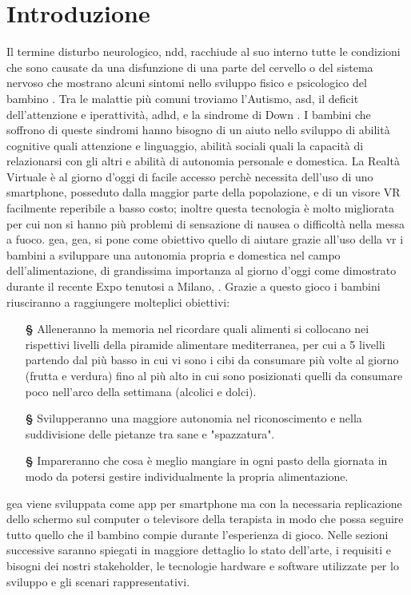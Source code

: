 \section{Introduzione} \label{sec:intro}
Il termine disturbo neurologico, \acs{ndd}, racchiude al suo interno tutte le condizioni che sono causate da una disfunzione di una parte del cervello o del sistema nervoso che mostrano alcuni sintomi nello sviluppo fisico e psicologico del bambino \cite{rif1}. Tra le malattie più comuni troviamo l'Autismo, \acs{asd}, il deficit dell'attenzione e iperattività, \acs{adhd}, e la sindrome di Down \cite{rif2}. I bambini che soffrono di queste sindromi hanno bisogno di un aiuto nello sviluppo di abilità cognitive quali attenzione e linguaggio, abilità sociali quali la capacità di relazionarsi con gli altri e abilità di autonomia personale e domestica. La Realtà Virtuale è al giorno d'oggi di facile accesso perchè necessita dell'uso di uno smartphone, posseduto dalla maggior parte della popolazione, e di un visore VR facilmente reperibile a basso costo; inoltre questa tecnologia è molto migliorata  per cui non si hanno più problemi di sensazione di nausea o difficoltà nella messa a fuoco. \acs{gea}, \acl{gea}, si pone come obiettivo quello di aiutare grazie all'uso della \acs{vr} i bambini a sviluppare una autonomia propria e domestica nel campo dell'alimentazione, di grandissima importanza al giorno d'oggi come dimostrato durante il recente Expo tenutosi a Milano, \cite{rif16}. Grazie a questo gioco i bambini riusciranno a raggiungere molteplici obiettivi:
\begin{itemize}
\item[\textbf{§}] Alleneranno la memoria nel ricordare quali alimenti si collocano nei rispettivi livelli della piramide alimentare mediterranea, per cui a 5 livelli partendo dal più basso in cui vi sono i cibi da consumare più volte al giorno (frutta e verdura) fino al più alto in cui sono posizionati quelli da consumare poco nell'arco della settimana (alcolici e dolci).
\item[\textbf{§}] Svilupperanno una maggiore autonomia nel riconoscimento e nella suddivisione delle pietanze tra sane e "spazzatura".
\item[\textbf{§}] Impareranno che cosa è meglio mangiare in ogni pasto della giornata in modo da potersi gestire individualmente la propria alimentazione.
\end{itemize} 
\acs{gea} viene sviluppata come app per smartphone ma con la necessaria replicazione dello schermo sul computer o televisore della terapista in modo che possa seguire tutto quello che il bambino compie durante l'esperienza di gioco. Nelle sezioni successive saranno spiegati in maggiore dettaglio lo stato dell'arte, i requisiti e bisogni dei nostri stakeholder, le tecnologie hardware e software utilizzate per lo sviluppo e gli scenari rappresentativi.